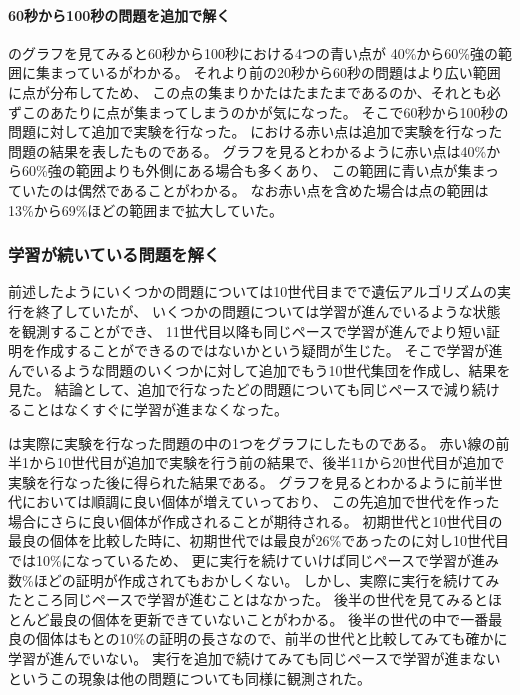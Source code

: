 \paragraph{60秒から100秒の問題を追加で解く}
のグラフを見てみると60秒から100秒における4つの青い点が
40\%から60\%強の範囲に集まっているがわかる。
それより前の20秒から60秒の問題はより広い範囲に点が分布してため、
この点の集まりかたはたまたまであるのか、それとも必ずこのあたりに点が集まってしまうのかが気になった。
そこで60秒から100秒の問題に対して追加で実験を行なった。
における赤い点は追加で実験を行なった問題の結果を表したものである。
グラフを見るとわかるように赤い点は40\%から60\%強の範囲よりも外側にある場合も多くあり、
この範囲に青い点が集まっていたのは偶然であることがわかる。
なお赤い点を含めた場合は点の範囲は13\%から69\%ほどの範囲まで拡大していた。



\subsubsection{学習が続いている問題を解く}

前述したようにいくつかの問題については10世代目までで遺伝アルゴリズムの実行を終了していたが、
いくつかの問題については学習が進んでいるような状態を観測することができ、
11世代目以降も同じペースで学習が進んでより短い証明を作成することができるのではないかという疑問が生じた。
そこで学習が進んでいるような問題のいくつかに対して追加でもう10世代集団を作成し、結果を見た。
結論として、追加で行なったどの問題についても同じペースで減り続けることはなくすぐに学習が進まなくなった。


は実際に実験を行なった問題の中の1つをグラフにしたものである。
赤い線の前半1から10世代目が追加で実験を行う前の結果で、後半11から20世代目が追加で実験を行なった後に得られた結果である。
グラフを見るとわかるように前半世代においては順調に良い個体が増えていっており、
この先追加で世代を作った場合にさらに良い個体が作成されることが期待される。
初期世代と10世代目の最良の個体を比較した時に、初期世代では最良が26\%であったのに対し10世代目では10\%になっているため、
更に実行を続けていけば同じペースで学習が進み数\%ほどの証明が作成されてもおかしくない。
しかし、実際に実行を続けてみたところ同じペースで学習が進むことはなかった。
後半の世代を見てみるとほとんど最良の個体を更新できていないことがわかる。
後半の世代の中で一番最良の個体はもとの10\%の証明の長さなので、前半の世代と比較してみても確かに学習が進んでいない。
実行を追加で続けてみても同じペースで学習が進まないというこの現象は他の問題についても同様に観測された。


